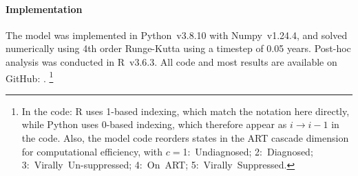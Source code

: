 \paragraph{Implementation}
The model was implemented in Python~v3.8.10 with Numpy~v1.24.4,
and solved numerically using 4th order Runge-Kutta \cite{Gill1951} using a timestep of 0.05 years.
Post-hoc analysis was conducted in R~v3.6.3.
All code and most results are available on GitHub:
.%
\footnote{\label{foot:code.note}%
  In the code: R uses 1-based indexing, which match the notation here directly,
  while Python uses 0-based indexing, which therefore appear as $i \rightarrow i-1$ in the code.
  Also, the model code reorders states in the ART cascade dimension for computational efficiency,
  with $c={}$1:~Undiagnosed; 2:~Diagnosed; 3:~Virally~Un-suppressed; 4:~On~ART; 5:~Virally~Suppressed.}
